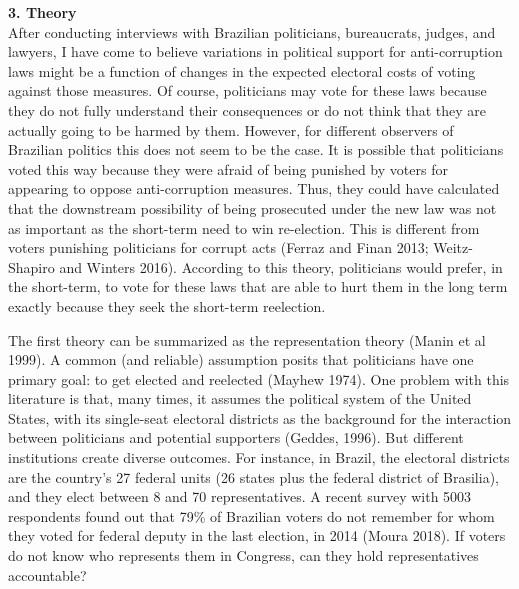\documentclass[12pt,a4paper]{article}
\begin{document}
\textbf{3. Theory}\\


After conducting interviews with Brazilian politicians, bureaucrats, judges, and lawyers, I have come to believe variations in political support for anti-corruption laws might be a function of changes in the expected electoral costs of voting against those measures. Of course, politicians may vote for these laws because they do not fully understand their consequences or do not think that they are actually going to be harmed by them. However, for different observers of Brazilian politics this does not seem to be the case. It is possible that politicians voted this way because they were afraid of being punished by voters for appearing to oppose anti-corruption measures. Thus, they could have calculated that the downstream possibility of being prosecuted under the new law was not as important as the short-term need to win re-election. This is different from voters punishing politicians for corrupt acts (Ferraz and Finan 2013; Weitz-Shapiro and Winters 2016). According to this theory, politicians would prefer, in the short-term, to vote for these laws that are able to hurt them in the long term exactly because they seek the short-term reelection. 

The first theory can be summarized as the representation theory (Manin et al 1999). A common (and reliable) assumption posits that politicians have one primary goal: to get elected and reelected (Mayhew 1974). One problem with this literature is that, many times, it assumes the political system of the United States, with its single-seat electoral districts as the background for the interaction between politicians and potential supporters (Geddes, 1996). But different institutions create diverse outcomes. For instance, in Brazil, the electoral districts are the country's 27 federal units (26 states plus the federal district of Brasilia), and they elect between 8 and 70 representatives. A recent survey with 5003 respondents found out that 79\% of Brazilian voters do not remember for whom they voted for federal deputy in the last election, in 2014 (Moura 2018). If voters do not know who represents them in Congress, can they hold representatives accountable?
\end{document}
